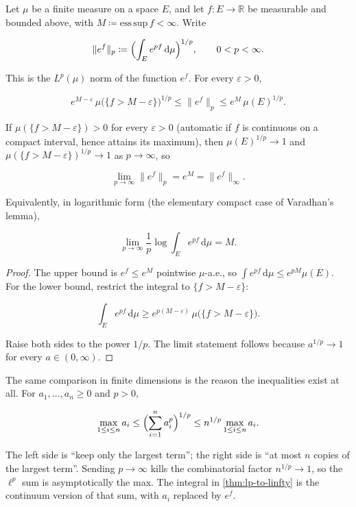 \documentclass[11pt,a4paper]{article}
\begin{document}
\begin{theorem}
\label{thm:lp-to-linfty}
Let \(\mu\) be a finite measure on a space \(E\), and let \(f\colon E\to\mathbb{R}\) be measurable and bounded above, with \(M\coloneqq\mathrm{ess\,sup}\,f<\infty\). Write

\[
\|e^{f}\|_{p}
\coloneqq
\Bigl(\int_{E} e^{p f}\,\mathrm{d}\mu\Bigr)^{1/p},
\qquad
0<p<\infty.
\]

This is the \(L^{p}(\mu)\) norm of the function \(e^{f}\). For every \(\varepsilon>0\),

\[
e^{M-\varepsilon}\,
\mu\bigl(\{f>M-\varepsilon\}\bigr)^{1/p}
\le
\|e^{f}\|_{p}
\le
e^{M}\,
\mu(E)^{1/p}.
\]

If \(\mu(\{f>M-\varepsilon\})>0\) for every \(\varepsilon>0\) (automatic if \(f\) is continuous on a compact interval, hence attains its maximum), then \(\mu(E)^{1/p}\to 1\) and \(\mu(\{f>M-\varepsilon\})^{1/p}\to 1\) as \(p\to\infty\), so

\[
\lim_{p\to\infty}
\|e^{f}\|_{p}
=
e^{M}
=
\|e^{f}\|_{\infty}.
\]

Equivalently, in logarithmic form (the elementary compact case of Varadhan's lemma),

\[
\lim_{p\to\infty}
\frac1p\log\int_{E} e^{p f}\,\mathrm{d}\mu
=
M.
\]
\end{theorem}

\begin{proof}
The upper bound is \(e^{f}\le e^{M}\) pointwise \(\mu\)-a.e., so \(\int e^{pf}\,\mathrm{d}\mu\le e^{pM}\mu(E)\). For the lower bound, restrict the integral to \(\{f>M-\varepsilon\}\):

\[
\int_{E} e^{p f}\,\mathrm{d}\mu
\ge
e^{p(M-\varepsilon)}\,
\mu\bigl(\{f>M-\varepsilon\}\bigr).
\]

Raise both sides to the power \(1/p\). The limit statement follows because \(a^{1/p}\to 1\) for every \(a\in(0,\infty)\).
\end{proof}

The same comparison in finite dimensions is the reason the inequalities exist at all. For \(a_1,\dots,a_n\ge 0\) and \(p>0\),

\[
\max_{1\le i\le n}a_i
\le
\Bigl(\sum_{i=1}^{n} a_i^{p}\Bigr)^{1/p}
\le
n^{1/p}\max_{1\le i\le n}a_i.
\]

The left side is ``keep only the largest term''; the right side is ``at most \(n\) copies of the largest term''. Sending \(p\to\infty\) kills the combinatorial factor \(n^{1/p}\to 1\), so the \(\ell^{p}\) sum is asymptotically the max. The integral in \cref{thm:lp-to-linfty} is the continuum version of that sum, with \(a_i\) replaced by \(e^{f}\).
\end{document}
